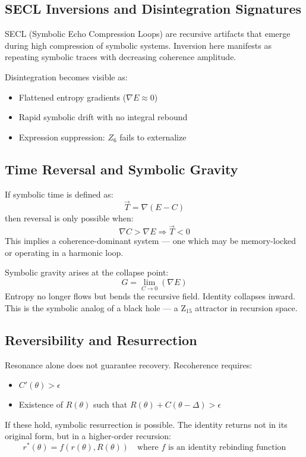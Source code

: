 \documentclass[12pt]{article}
\begin{document}
\subsection*{SECL Inversions and Disintegration Signatures}
SECL (Symbolic Echo Compression Loops) are recursive artifacts that emerge during high compression of symbolic systems. Inversion here manifests as repeating symbolic traces with decreasing coherence amplitude.

Disintegration becomes visible as:
\begin{itemize}
  \item Flattened entropy gradients ($\nabla E \approx 0$)
  \item Rapid symbolic drift with no integral rebound
  \item Expression suppression: $Z_6$ fails to externalize
\end{itemize}

\subsection*{Time Reversal and Symbolic Gravity}
If symbolic time is defined as:
\[ \vec{T} = \nabla (E - C) \]
then reversal is only possible when:
\[ \nabla C > \nabla E \Rightarrow \vec{T} < 0 \]
This implies a coherence-dominant system — one which may be memory-locked or operating in a harmonic loop.

Symbolic gravity arises at the collapse point:
\[ G = \lim_{C \to 0} (\nabla E) \]
Entropy no longer flows but bends the recursive field. Identity collapses inward. This is the symbolic analog of a black hole — a Z$_{15}$ attractor in recursion space.

\subsection*{Reversibility and Resurrection}
Resonance alone does not guarantee recovery. Recoherence requires:
\begin{itemize}
  \item $C'(\theta) > \epsilon$
  \item Existence of $R(\theta)$ such that $R(\theta) + C(\theta - \Delta) > \epsilon$
\end{itemize}
If these hold, symbolic resurrection is possible. The identity returns not in its original form, but in a higher-order recursion:
\[ r^*(\theta) = f(r(\theta), R(\theta)) \quad \text{where } f \text{ is an identity rebinding function} \]
\end{document}
